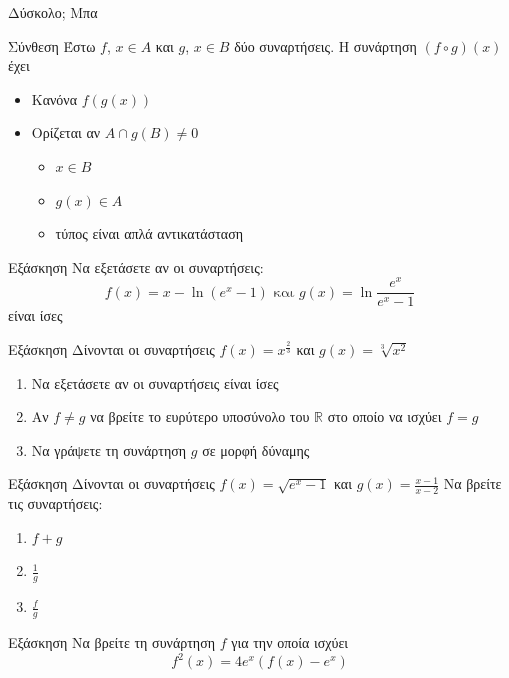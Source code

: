 \documentclass[greek]{beamer}
\begin{document}
\begin{frame}{Δύσκολο; Μπα}
 \begin{block}{Σύνθεση}
  Έστω $f$, $x\in Α$ και $g$, $x\in Β$ δύο συναρτήσεις. Η συνάρτηση $(f\circ g)(x)$ έχει
  \begin{itemize}
   \item Κανόνα $f(g(x))$
   \item Ορίζεται αν $Α\cap g(Β)\ne 0$
         \begin{itemize}
          \item<2-> $x\in Β$
          \item<3-> $g(x)\in Α$
          \item<4-> τύπος είναι απλά αντικατάσταση
         \end{itemize}
  \end{itemize}
 \end{block}
\end{frame}

\begin{frame}{Εξάσκηση}
 Να εξετάσετε αν οι συναρτήσεις:
 $$f(x)=x-\ln (e^x-1) \text{ και } g(x)=\ln\frac{e^x}{e^x-1}$$
 είναι ίσες
\end{frame}

\begin{frame}{Εξάσκηση}
 Δίνονται οι συναρτήσεις $f(x)=x^{\frac{2}{3}}$ και $g(x)=\sqrt[3]{x^2}$
 \begin{enumerate}
  \item<1-> Να εξετάσετε αν οι συναρτήσεις είναι ίσες
  \item<2-> Αν $f\ne g$ να βρείτε το ευρύτερο υποσύνολο του $\mathbb{R}$ στο οποίο να ισχύει $f=g$
  \item<3-> Να γράψετε τη συνάρτηση $g$ σε μορφή δύναμης
 \end{enumerate}
\end{frame}

\begin{frame}{Εξάσκηση}
 Δίνονται οι συναρτήσεις $f(x)=\sqrt{e^x-1}$ και $g(x)=\frac{x-1}{x-2}$
 Να βρείτε τις συναρτήσεις:
 \begin{enumerate}
  \item<1-> $f+g$
  \item<2-> $\frac{1}{g}$
  \item<3-> $\frac{f}{g}$
 \end{enumerate}
\end{frame}

\begin{frame}{Εξάσκηση}
 Να βρείτε τη συνάρτηση $f$ για την οποία ισχύει
 $$f^2(x)=4e^x\left(f(x)-e^x\right)$$
\end{frame}
\end{document}
